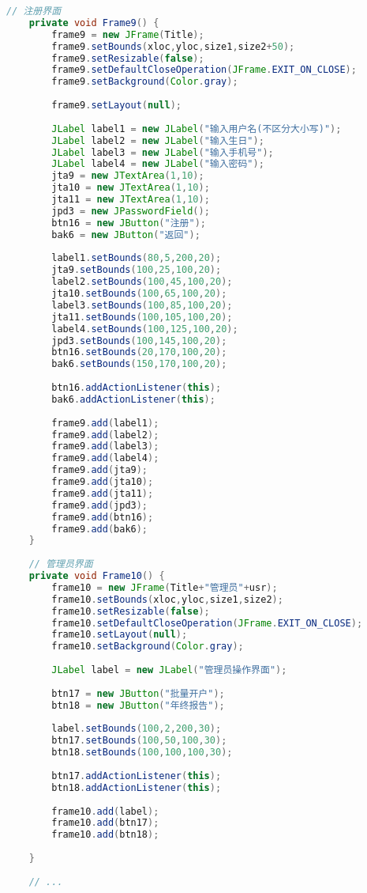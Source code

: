 \begin{lstlisting}[language = java, caption = UI.java]
	// 注册界面
	private void Frame9() {
		frame9 = new JFrame(Title);
		frame9.setBounds(xloc,yloc,size1,size2+50);
		frame9.setResizable(false);
		frame9.setDefaultCloseOperation(JFrame.EXIT_ON_CLOSE);
		frame9.setBackground(Color.gray);
		
		frame9.setLayout(null);
		
		JLabel label1 = new JLabel("输入用户名(不区分大小写)");
		JLabel label2 = new JLabel("输入生日");
		JLabel label3 = new JLabel("输入手机号");
		JLabel label4 = new JLabel("输入密码");
		jta9 = new JTextArea(1,10);
		jta10 = new JTextArea(1,10);
		jta11 = new JTextArea(1,10);
		jpd3 = new JPasswordField();
		btn16 = new JButton("注册");
		bak6 = new JButton("返回");
		
		label1.setBounds(80,5,200,20);
		jta9.setBounds(100,25,100,20);
		label2.setBounds(100,45,100,20);
		jta10.setBounds(100,65,100,20);
		label3.setBounds(100,85,100,20);
		jta11.setBounds(100,105,100,20);
		label4.setBounds(100,125,100,20);
		jpd3.setBounds(100,145,100,20);
		btn16.setBounds(20,170,100,20);
		bak6.setBounds(150,170,100,20);
		
		btn16.addActionListener(this);
		bak6.addActionListener(this);
		
		frame9.add(label1);
		frame9.add(label2);
		frame9.add(label3);
		frame9.add(label4);
		frame9.add(jta9);
		frame9.add(jta10);
		frame9.add(jta11);
		frame9.add(jpd3);
		frame9.add(btn16);
		frame9.add(bak6);
	}
	
	// 管理员界面
	private void Frame10() {
		frame10 = new JFrame(Title+"管理员"+usr);
		frame10.setBounds(xloc,yloc,size1,size2);
		frame10.setResizable(false);
		frame10.setDefaultCloseOperation(JFrame.EXIT_ON_CLOSE);
		frame10.setLayout(null);
		frame10.setBackground(Color.gray);
		
		JLabel label = new JLabel("管理员操作界面");
		
		btn17 = new JButton("批量开户");
		btn18 = new JButton("年终报告");
		
		label.setBounds(100,2,200,30);
		btn17.setBounds(100,50,100,30);
		btn18.setBounds(100,100,100,30);
		
		btn17.addActionListener(this);
		btn18.addActionListener(this);
		
		frame10.add(label);
		frame10.add(btn17);
		frame10.add(btn18);
		
	}
	
	// ...
	
	
	

\end{lstlisting}
